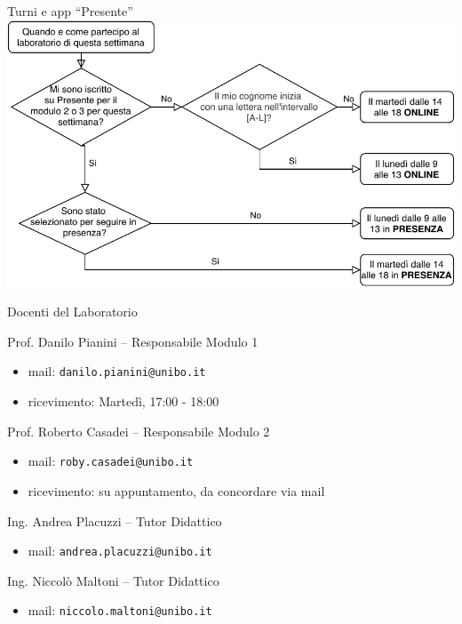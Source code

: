 \documentclass[presentation]{beamer}
\begin{document}
\begin{frame}{Turni e app ``Presente''}
    \includegraphics[width=\textwidth]{covid-presente}
\end{frame}

\begin{frame}{Docenti del Laboratorio}
    \begin{block}{Prof. Danilo Pianini -- Responsabile Modulo 1}
        \begin{itemize}
            \item mail: \texttt{danilo.pianini@unibo.it}
            \item ricevimento: Martedì, 17:00 - 18:00
        \end{itemize}
    \end{block}
    \begin{block}{Prof. Roberto Casadei -- Responsabile Modulo 2}
        \begin{itemize}
            \item mail: \texttt{roby.casadei@unibo.it}
            \item ricevimento: su appuntamento, da concordare via mail
        \end{itemize}
    \end{block}
    \begin{block}{Ing. Andrea Placuzzi -- Tutor Didattico}
        \begin{itemize}
            \item mail: \texttt{andrea.placuzzi@unibo.it}
        \end{itemize}
    \end{block}
    \begin{block}{Ing. Niccolò Maltoni -- Tutor Didattico}
        \begin{itemize}
            \item mail: \texttt{niccolo.maltoni@unibo.it}
        \end{itemize}
    \end{block}
\end{frame}
\end{document}

